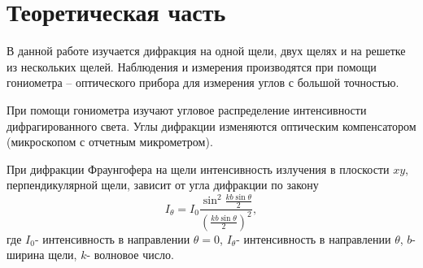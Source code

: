 
\usepackage{setspace}
\usepackage{amsmath}


\DeclareMathOperator{\sinc}{sinc}
\newcommand{\dif}[3]{


	\pgfplotstablegetelem{0}{#2}\of#1

	\pgfplotstablecreatecol
	    [expr={\thisrow{#2} - \pgfplotsretval}]
	    {LocalDistance#3}{#1}

	\pgfplotstablecreatecol
	    [expr={-\thisrow{LocalDistance#3} + \prevrow{LocalDistance#3}}]
	    {#3}{#1}
}
\newcommand{\Exp}[1]{
	\exp\left(#1\right)
}
\newcommand{\Sinc}[1]{
	\sinc\left(#1\right)
}
\newcommand{\Sin}[1]{
	\sin\left(#1\right)
}


\def\labauthors{Понур К.А., Сарафанов Ф.Г., Сидоров Д.А.}
\def\labgroup{420}
\def\labnumber{320}
\def\labtheme{Дифракций Фраунгофера}
\renewcommand{\vec}{\mathbf}
\renewcommand{\Re}{\operatorname{Re}}
\renewcommand{\Im}{\operatorname{Im}}
\renewcommand{\phi}{\varphi}
\renewcommand{\kappa}{\varkappa}
\renewcommand{\hat}{\widehat}

\begin{spacing}{1}
\tableofcontents
\end{spacing}
\newpage
 \section{Теоретическая часть}
В данной работе изучается дифракция на одной щели, двух щелях и на решетке из нескольких щелей. Наблюдения и измерения производятся при помощи гониометра -- оптического прибора для измерения углов с большой точностью. 

При помощи гониометра изучают угловое распределение интенсивности дифрагированного света. Углы дифракции изменяются оптическим компенсатором (микроскопом с отчетным микрометром).

При дифракции Фраунгофера на щели интенсивность излучения в плоскости $xy$, перпендикулярной щели, зависит от угла дифракции по закону
\begin{equation}
	I_{\theta}=I_0\frac{\sin^2\frac{kb\sin\theta}{2}}{(\frac{kb\sin\theta}{2})^2},		
\end{equation}
где $I_0$- интенсивность в направлении $\theta=0$, $I_{\theta}$- интенсивность в направлении $\theta$, $b$- ширина щели, $k$- волновое число.

